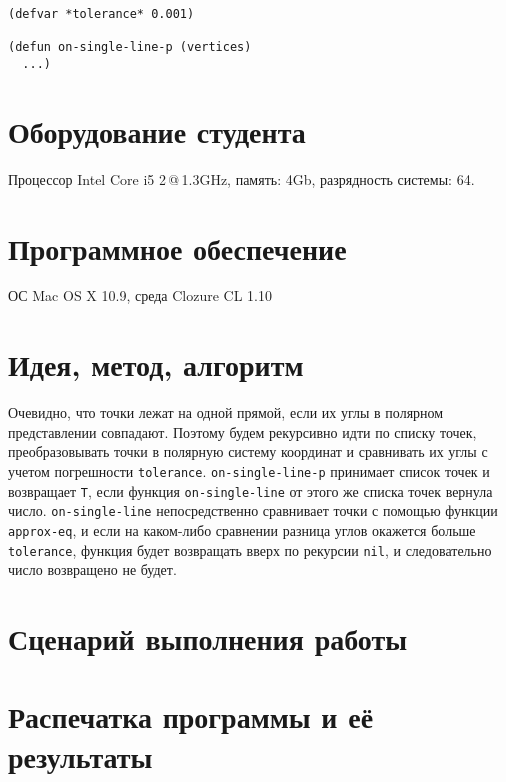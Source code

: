 \documentclass[a4paper, 12pt]{article}
\begin{document}
\begin{lstlisting}
(defvar *tolerance* 0.001)

(defun on-single-line-p (vertices)
  ...)
\end{lstlisting}


\section{Оборудование студента}
Процессор Intel Core i5 2\,@\,1.3GHz, память: 4Gb, разрядность системы: 64.


\section{Программное обеспечение}
ОС Mac OS X 10.9, среда Clozure CL 1.10


\section{Идея, метод, алгоритм}
Очевидно, что точки лежат на одной прямой, если их углы в полярном представлении совпадают. Поэтому будем рекурсивно идти по списку точек, преобразовывать точки в полярную систему координат и сравнивать их углы с учетом погрешности {\tt tolerance}. {\tt on-single-line-p} принимает список точек и возвращает {\tt T}, если функция {\tt on-single-line} от этого же списка точек вернула число. {\tt on-single-line} непосредственно сравнивает точки с помощью функции {\tt approx-eq}, и если на каком-либо сравнении разница углов окажется больше {\tt tolerance}, функция будет возвращать вверх по рекурсии {\tt nil}, и следовательно число возвращено не будет.

\section{Сценарий выполнения работы}


\section{Распечатка программы и её результаты}
\end{document}
